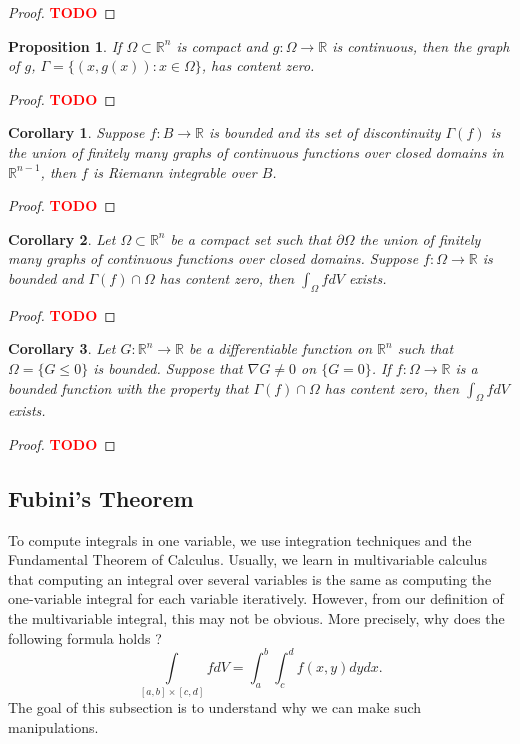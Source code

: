 \documentclass{article}
\theoremstyle{plain}
\newtheorem{proposition}[theorem]{Proposition}
\newtheorem*{corollary}{Corollary}
\theoremstyle{definition}
\newcommand{\R}{\mathbb{R}}
\newcommand{\td}{\textcolor{red}{\textbf{TODO}}}
\begin{document}
\begin{proof}
    \td 
\end{proof}

\begin{proposition}
    If $\Omega \subset \R^n$ is compact and $g : \Omega \to \R$ is continuous, then the graph of $g$, $\Gamma = \{(x,g(x)) : x \in \Omega\}$, has content zero.
\end{proposition}

\begin{proof}
    \td 
\end{proof}

\begin{corollary}
    Suppose $f : B \to \R$ is bounded and its set of discontinuity $\Gamma(f)$ is the union of finitely many graphs of continuous  functions over closed domains in $\R^{n-1}$, then $f$ is Riemann integrable over $B$.
\end{corollary}

\begin{proof}
    \td 
\end{proof}

\begin{corollary}
    Let $\Omega \subset \R^n$ be a compact set such that $\partial \Omega$  the union of finitely many graphs of continuous functions over closed domains. Suppose $f : \Omega \to \R$ is bounded and $\Gamma(f)\cap \Omega$ has content zero, then $\int_{\Omega} f dV$ exists.
\end{corollary}

\begin{proof}
    \td 
\end{proof}

\begin{corollary}
    Let $G : \R^n \to \R$ be a differentiable function on $\R^n$ such that $\Omega = \{G \leq 0\}$ is bounded. Suppose that $\nabla G \neq 0$ on $\{G = 0\}$. If $f : \Omega \to \R$ is a bounded function with the property that $\Gamma(f) \cap \Omega$ has content zero, then $\int_{\Omega}f dV$ exists.
\end{corollary}

\begin{proof}
    \td 
\end{proof}

\subsection{Fubini's Theorem}

To compute integrals in one variable, we use integration techniques and the Fundamental Theorem of Calculus. Usually, we learn in multivariable calculus that computing an integral over several variables is the same as computing the one-variable integral for each variable iteratively. However, from our definition of the multivariable integral, this may not be obvious. More precisely, why does the following formula holds ?
$$\int\limits_{[a,b] \times [c,d]}f dV = \int_{a}^{b}\int_{c}^{d}f(x,y)dydx.$$
The goal of this subsection is to understand why we can make such manipulations.
\end{document}
